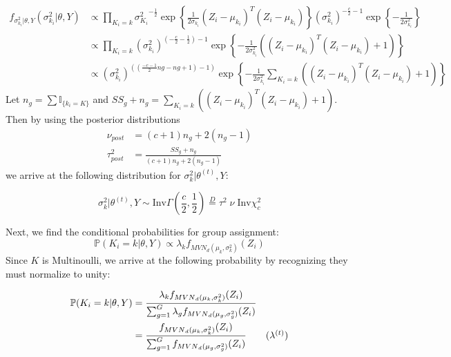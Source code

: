 \documentclass{article}
\begin{document}
\begin{align*}
f_{\sigma_{k_i}^2|\theta, Y}(\sigma_{k_i}^2|\theta, Y) &\propto \prod_{K_i = k} 
{\sigma_{K_i}^2}^{-\frac{1}{2}} 
\exp \left\{ \frac{1}{2 \sigma_{k_i}}(Z_i-\mu_{k_i})^T(Z_i-\mu_{k_i})\right\} 
(\sigma_{k_i}^2)^{-\frac{c}{2} -1}  
 \exp \left\{-\frac{1}{2 \sigma_{k_i}^2}\right\} \\
 &\propto  \prod_{K_i = k} (\sigma_{k_i} ^2 )^{(- \frac{c}{2} - \frac{1}{2}) -1}  
 \exp\left\{-\frac{1}{2 \sigma_{k_i}^2}\left((Z_i-\mu_{k_i})^T(Z_i-\mu_{k_i})+1\right)\right\} \\
 & \propto (\sigma_{k_i} ^2 )^{\left( (\frac{-c-1}{2} ng - ng +1 ) -1\right)}  
 \exp\left\{-\frac{1}{2 \sigma_{k_i}^2} \sum_{K_i = k} \left((Z_i-\mu_{k_i})^T(Z_i-\mu_{k_i})+1\right)\right\}
 \end{align*}
Let $n_g = \sum \mathbb{I} _{\{ k_i = K\}}$ and $SS_g + n_g = \sum_{K_i = k} \left((Z_i-\mu_{k_i})^T(Z_i-\mu_{k_i})+1\right) $. 
Then by using the posterior distributions 
\begin{align*}
\nu_{post} &= (c + 1) n_g + 2( n_g - 1 )   \\
 \tau^2_{post} &= \frac{SS_g + n_g} {(c + 1) n_g + 2 ( n_g -1)}
 \end{align*} 
 we arrive at the following distribution for $\sigma_k^2 | \theta^{(t)}, Y$:


$$ \sigma_k^2 | \theta^{(t)}, Y \sim \text{Inv} \Gamma ( \frac{c}{2}, \frac{1}{2})  \overset{D}= \tau^2  \;\nu \; \text{Inv} \chi^2_c$$

Next, we find the conditional probabilities for group assignment:
\[\mathbb{P}(K_i = k | \theta, Y) \propto \lambda_k f_{{MVN}_d(\mu_k, \sigma_k^2)}(Z_i)\]
Since $K$ is Multinoulli, we arrive at the following probability by recognizing they must normalize to unity:

\begin{align*}
\mathbb{P}(K_i = k | \theta, Y) &= \frac{\lambda_k f_{{MVN}_d(\mu_k, \sigma_k^2)}(Z_i)}{\sum_{g=1}^G\lambda_g f_{{MVN}_d(\mu_g, \sigma_g^2)}(Z_i)} \\
&= \frac{f_{{MVN}_d(\mu_k, \sigma_k^2)}(Z_i)}{\sum_{g=1}^G f_{{MVN}_d(\mu_g, \sigma_g^2)}(Z_i)} \tag{$\lambda^{(t)}$}
\end{align*}
\end{document}
